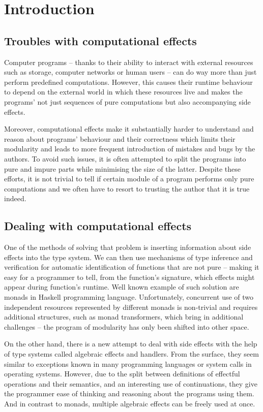 \chapter{Introduction}

\section{Troubles with computational effects}

Computer programs -- thanks to their ability to interact with external resources such as storage, computer networks or human users -- can do way more than just perform predefined computations. However, this causes their runtime behaviour to depend on the external world in which these resources live and makes the programs' not just sequences of pure computations but also accompanying side effects.

Moreover, computational effects make it substantially harder to understand and reason about programs' behaviour and their correctness which limits their modularity and leads to more frequent introduction of mistakes and bugs by the authors. To avoid such issues, it is often attempted to split the programs into pure and impure parts while minimising the size of the latter. Despite these efforts, it is not trivial to tell if certain module of a program performs only pure computations and we often have to resort to trusting the author that it is true indeed.

\section{Dealing with computational effects}

One of the methods of solving that problem is inserting information about side effects into the type system. We can then use mechanisms of type inference and verification for automatic identification of functions that are not pure -- making it easy for a programmer to tell, from the function's signature, which effects might appear during function's runtime. Well known example of such solution are monads in Haskell programming language. Unfortunately, concurrent use of two independent resources represented by different monads is non-trivial and requires additional structures, such as monad transformers, which bring in additional challenges -- the program of modularity has only been shifted into other space.

On the other hand, there is a new attempt to deal with side effects with the help of type systems called algebraic effects and handlers. From the surface, they seem similar to exceptions known in many programming languages or system calls in operating systems. However, due to the split between definitions of effectful operations and their semantics, and an interesting use of continuations, they give the programmer ease of thinking and reasoning about the programs using them. And in contrast to monads, multiple algebraic effects can be freely used at once.

